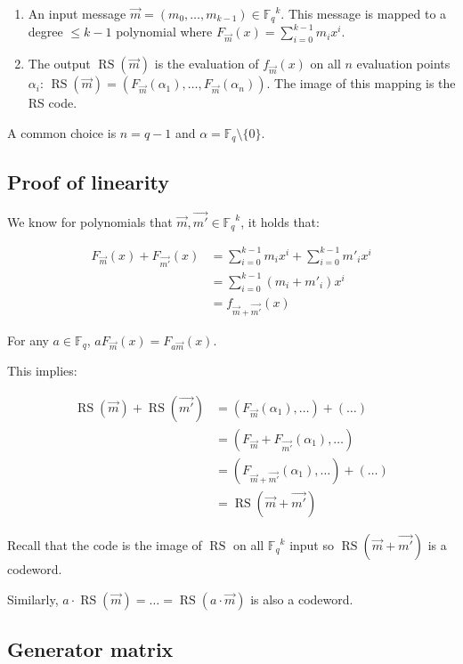 \documentclass{idc_msc}
\newcommand{\Fq}[1][q]{{\mathbb{F}_{#1}}}
\DeclareMathOperator*{\RS}{RS}
\begin{document}
\begin{enumerate}
  \item An input message \(\vec{m} = (m_0,\ldots,m_{k-1}) \in \Fq^k\).
    This message is mapped to a degree \(\le k - 1\) polynomial where \(F_{\vec{m}}(x) = \sum_{i=0}^{k-1} m_i x^i\).
  \item The output \(\RS(\vec{m})\) is the evaluation of \(f_{\vec{m}}(x)\) on all \(n\) evaluation points \(\alpha_i\):
    \(\RS(\vec{m}) = (F_{\vec{m}}(\alpha_1),\ldots,F_{\vec{m}}(\alpha_n))\).
    The image of this mapping is the RS code.
\end{enumerate}

A common choice is \(n = q-1\) and \(\alpha = \Fq \setminus \{0\}\).

\subsection{Proof of linearity}

We know for polynomials that \(\vec{m},\vec{m'} \in \Fq^k\), it holds that:

\[
\begin{aligned}
F_{\vec{m}}(x) + F_{\vec{m'}}(x)
& = \sum_{i=0}^{k-1} m_i x^i + \sum_{i=0}^{k-1} m'_i x^i \\
& = \sum_{i=0}^{k-1} (m_i + m'_i) x^i \\
& = f_{\vec{m} + \vec{m'}}(x)
\end{aligned}
\]

For any \(a \in \Fq\), \(aF_{\vec{m}}(x) = F_{a \vec{m}}(x)\).

This implies:

\[
\begin{aligned}
\RS(\vec{m}) + \RS(\vec{m'})
& = (F_{\vec{m}}(\alpha_1),\ldots) + (\ldots) \\
& = (F_{\vec{m}} + F_{\vec{m'}}(\alpha_1),\ldots) \\
& = (F_{\vec{m} + \vec{m'}}(\alpha_1),\ldots) + (\ldots) \\
& = \RS(\vec{m} + \vec{m'})
\end{aligned}
\]

Recall that the code is the image of \(\RS\) on all \(\Fq^k\) input so \(\RS(\vec{m} + \vec{m'})\) is a codeword.

Similarly, \(a \cdot \RS(\vec{m}) = \ldots = \RS(a \cdot \vec{m})\) is also a codeword.

\subsection{Generator matrix}
\end{document}
